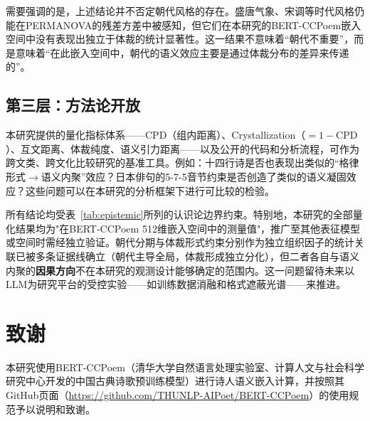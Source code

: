 \documentclass[12pt,a4paper]{article}
\numberwithin{equation}{section}
\begin{document}
需要强调的是，上述结论并不否定朝代风格的存在。盛唐气象、宋调等时代风格仍能在PERMANOVA的残差方差中被感知，但它们在本研究的BERT-CCPoem嵌入空间中没有表现出独立于体裁的统计显著性。这一结果不意味着“朝代不重要”，而是意味着“在此嵌入空间中，朝代的语义效应主要是通过体裁分布的差异来传递的”。

\subsection*{第三层：方法论开放}

本研究提供的量化指标体系——CPD（组内距离）、Crystallization（$=1-\text{CPD}$）、互文距离、体裁纯度、语义引力距离——以及公开的代码和分析流程，可作为跨文类、跨文化比较研究的基准工具。例如：十四行诗是否也表现出类似的“格律形式$\to$语义内聚”效应？日本俳句的5-7-5音节约束是否创造了类似的语义凝固效应？这些问题可以在本研究的分析框架下进行可比较的检验。

所有结论均受表~\ref{tab:epistemic}所列的认识论边界约束。特别地，本研究的全部量化结果均为"在BERT-CCPoem 512维嵌入空间中的测量值"，推广至其他表征模型或空间时需经独立验证。朝代分期与体裁形式约束分别作为独立组织因子的统计关联已被多条证据线确立（朝代主导全局，体裁形成独立分化），但二者各自与语义内聚的\textbf{因果方向}不在本研究的观测设计能够确定的范围内。这一问题留待未来以LLM为研究平台的受控实验——如训练数据消融和格式遮蔽光谱——来推进。

\vspace{1.5ex}
\section*{致谢}
本研究使用BERT-CCPoem（清华大学自然语言处理实验室、计算人文与社会科学研究中心开发的中国古典诗歌预训练模型）进行诗人语义嵌入计算，并按照其GitHub页面（\url{https://github.com/THUNLP-AIPoet/BERT-CCPoem}）的使用规范予以说明和致谢。

\vspace{1.5ex}
\end{document}
